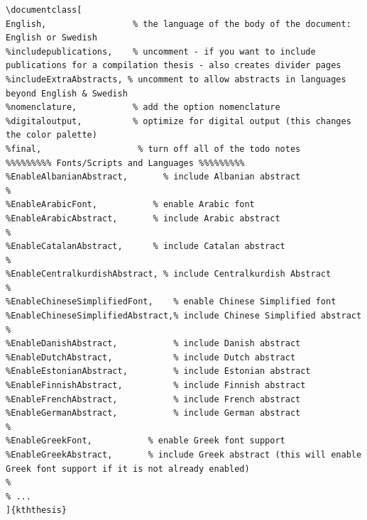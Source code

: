 \documentclass[12pt, twoside]{article}
\begin{document}
\begin{lstlisting}[style=latexExampleForAuthors, caption={Configuring the documentClass}, label=lst:configDocClass]
\documentclass[
English,                 % the language of the body of the document: English or Swedish
%includepublications,    % uncomment - if you want to include publications for a compilation thesis - also creates divider pages
%includeExtraAbstracts, % uncomment to allow abstracts in languages beyond English & Swedish
%nomenclature,           % add the option nomenclature
%digitaloutput,          % optimize for digital output (this changes the color palette)
%final,                   % turn off all of the todo notes
%%%%%%%%% Fonts/Scripts and Languages %%%%%%%%%
%EnableAlbanianAbstract,       % include Albanian abstract
%
%EnableArabicFont,           % enable Arabic font
%EnableArabicAbstract,       % include Arabic abstract
%
%EnableCatalanAbstract,      % include Catalan abstract
%
%EnableCentralkurdishAbstract, % include Centralkurdish Abstract
%
%EnableChineseSimplifiedFont,    % enable Chinese Simplified font
%EnableChineseSimplifiedAbstract,% include Chinese Simplified abstract
%
%EnableDanishAbstract,           % include Danish abstract
%EnableDutchAbstract,            % include Dutch abstract
%EnableEstonianAbstract,         % include Estonian abstract
%EnableFinnishAbstract,          % include Finnish abstract
%EnableFrenchAbstract,           % include French abstract
%EnableGermanAbstract,           % include German abstract
%
%EnableGreekFont,           % enable Greek font support
%EnableGreekAbstract,       % include Greek abstract (this will enable Greek font support if it is not already enabled)
%
% ...
]{kththesis}
\end{lstlisting}
\end{document}
